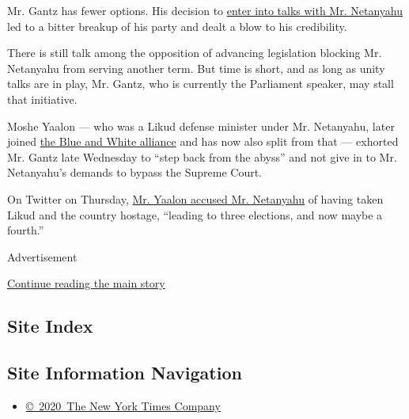 Mr. Gantz has fewer options. His decision to
\href{https://www.nytimes.com/2020/03/26/world/middleeast/israel-netanyahu-gantz-government.html}{enter
into talks with Mr. Netanyahu} led to a bitter breakup of his party and
dealt a blow to his credibility.

There is still talk among the opposition of advancing legislation
blocking Mr. Netanyahu from serving another term. But time is short, and
as long as unity talks are in play, Mr. Gantz, who is currently the
Parliament speaker, may stall that initiative.

Moshe Yaalon --- who was a Likud defense minister under Mr. Netanyahu,
later joined
\href{https://www.nytimes.com/2019/03/22/world/middleeast/israel-generals-politics-netanyahu.html}{the
Blue and White alliance} and has now also split from that --- exhorted
Mr. Gantz late Wednesday to ``step back from the abyss'' and not give in
to Mr. Netanyahu's demands to bypass the Supreme Court.

On Twitter on Thursday,
\href{https://twitter.com/bogie_yaalon/status/1250639368261447680}{Mr.
Yaalon accused Mr. Netanyahu} of having taken Likud and the country
hostage, ``leading to three elections, and now maybe a fourth.''

Advertisement

\protect\hyperlink{after-bottom}{Continue reading the main story}

\hypertarget{site-index}{%
\subsection{Site Index}\label{site-index}}

\hypertarget{site-information-navigation}{%
\subsection{Site Information
Navigation}\label{site-information-navigation}}

\begin{itemize}
\tightlist
\item
  \href{https://help.nytimes.com/hc/en-us/articles/115014792127-Copyright-notice}{©~2020~The
  New York Times Company}
\end{itemize}

